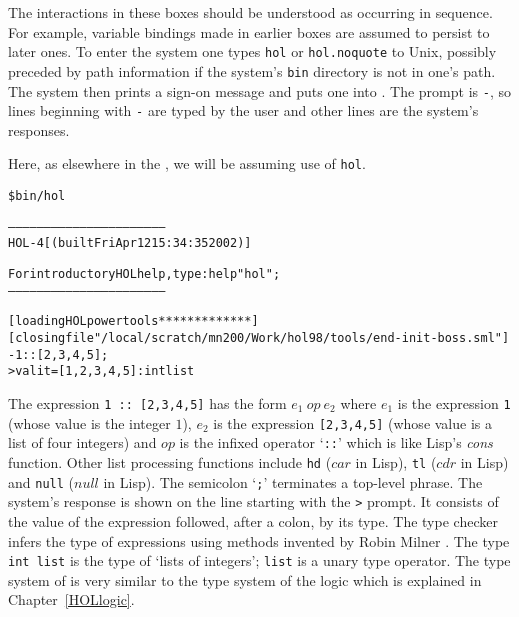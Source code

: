 The interactions in these boxes should be understood as occurring in
sequence.  For example, variable bindings made in earlier boxes are
assumed to persist to later ones.  To enter the \HOL{} system one
types {\small\verb|hol|} or {\small\verb|hol.noquote|} to Unix,
possibly preceded by path information if the \HOL{} system's
\texttt{bin} directory is not in one's path.  The \HOL{} system then
prints a sign-on message and puts one into \ML.  The \ML{} prompt is
{\small\verb|-|}, so lines beginning with {\small\verb|-|} are typed
by the user and other lines are the system's responses.

  Here, as elsewhere in the \TUTORIAL{}, we will be assuming use of
  {\small\verb|hol|}.

\setcounter{sessioncount}{0}
\begin{session}\begin{alltt}
\$ bin/hol

-----------------------------------------------------------------
       HOL-4 [\holnsversion (built Fri Apr 12 15:34:35 2002)]

       For introductory HOL help, type: help "hol";
-----------------------------------------------------------------

[loading HOL power tools ************* ]
[closing file "/local/scratch/mn200/Work/hol98/tools/end-init-boss.sml"]
- 1 :: [2,3,4,5];
> val it = [1, 2, 3, 4, 5] : int list
\end{alltt}
\end{session}

The \ML{} expression {\small\verb|1 :: [2,3,4,5]|} has the form $e_1\
op\ e_2$ where $e_1$ is the expression {\small\verb|1|} (whose value
is the integer $1$), $e_2$ is the expression {\small\verb|[2,3,4,5]|}
(whose value is a list of four integers) and $op$ is the infixed
operator `{\small\verb|::|}' which is like Lisp's {\it cons} function.
Other list processing functions include {\small\verb|hd|} ($car$ in
Lisp), {\small\verb|tl|} ($cdr$ in Lisp) and {\small\verb|null|}
($null$ in Lisp).  The semicolon `{\small\verb|;|}' terminates a
top-level phrase.  The system's response is shown on the line starting
with the {\small\verb|>|} prompt.  It consists of the value of the
expression followed, after a colon, by its type. The \ML{} type checker
infers the type of expressions using methods invented by Robin Milner
\cite{Milner-types}. The type {\small\verb|int list|} is the type of
`lists of integers'; {\small\verb|list|} is a unary type operator.
The type system of \ML{} is very similar to the type system of the
\HOL{} logic which is explained in Chapter~\ref{HOLlogic}.

